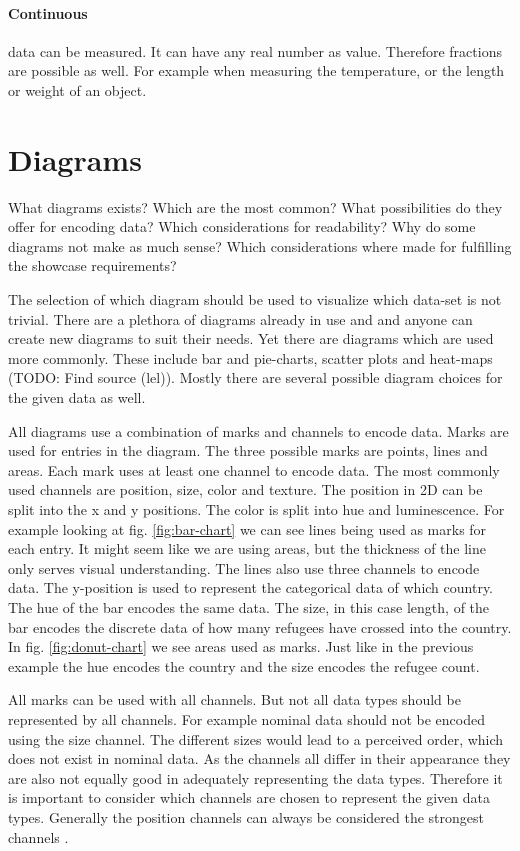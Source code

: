 \paragraph{Continuous}
data can be measured. It can have any real number as value. Therefore fractions are possible as well. For example when measuring the temperature, or the length or weight of an object.


\section{Diagrams}
What diagrams exists? Which are the most common? What possibilities do they offer for encoding data? Which considerations for readability? Why do some diagrams not make as much sense? Which considerations where made for fulfilling the showcase requirements?

The selection of which diagram should be used to visualize which data-set is not trivial. There are a plethora of diagrams already in use and and anyone can create new diagrams to suit their needs. Yet there are diagrams which are used more commonly. These include bar and pie-charts, scatter plots and heat-maps (TODO: Find source (lel)). Mostly there are several possible diagram choices for the given data as well.

All diagrams use a combination of marks and channels to encode data. Marks are used for entries in the diagram. The three possible marks are points, lines and areas. Each mark uses at least one channel to encode data. The most commonly used channels are position, size, color and texture. The position in 2D can be split into the x and y positions. The color is split into hue and luminescence. For example looking at fig. \ref{fig:bar-chart} we can see lines being used as marks for each entry. It might seem like we are using areas, but the thickness of the line only serves visual understanding. The lines also use three channels to encode data. The y-position is used to represent the categorical data of which country. The hue of the bar encodes the same data. The size, in this case length, of the bar encodes the discrete data of how many refugees have crossed into the country. In fig. \ref{fig:donut-chart} we see areas used as marks. Just like in the previous example the hue encodes the country and the size encodes the refugee count. 

All marks can be used with all channels. But not all data types should be represented by all channels. For example nominal data should not be encoded using the size channel. The different sizes would lead to a perceived order, which does not exist in nominal data. As the channels all differ in their appearance they are also not equally good in adequately representing the data types. Therefore it is important to consider which channels are chosen to represent the given data types. Generally the position channels can always be considered the strongest channels \cite{mackinlay1986automating}.


